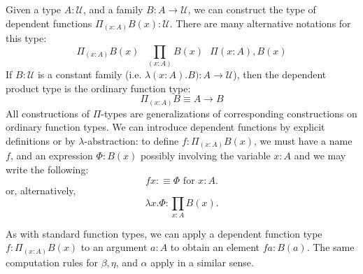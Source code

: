 \documentclass[letterpaper, 10 pt, conference]{ieeeconf}  %
\begin{document}
Given a type $A : \mathcal{U}$, and a family $B: A \rightarrow \mathcal{U}$, we can construct the type of dependent functions $\Pi_{(x:A)}B(x) : \mathcal{U}$. There are many alternative notations for this type: 
\begin{equation}
    \Pi_{(x:A)}B(x)\text{ }\prod_{(x:A)} B(x)\text{ }\Pi (x: A), B(x)
\end{equation}
If $B : \mathcal{U}$ is a constant family (i.e. $\lambda(x : A). B) : A \rightarrow \mathcal{U}$), then the dependent product type is the ordinary function type: 
\begin{equation}
    \Pi_{(x:A)} B \equiv A \rightarrow B
\end{equation}
All constructions of $\Pi$-types are generalizations of corresponding constructions on ordinary function types. We can introduce dependent functions by explicit definitions or by $\lambda$-abstraction: to define $f : \Pi_{(x:A)} B(x)$, we must have a name $f$, and an expression $\Phi : B(x)$ possibly involving the variable $x : A$ and we may write the following:
\begin{equation}
    f x :\equiv \Phi \text{ for } x : A.
\end{equation}
or, alternatively,
\begin{equation}
    \lambda x. \Phi : \prod_{x:A} B(x).
\end{equation}

As with standard function types, we can apply a dependent function type $f : \Pi_{(x:A)} B(x)$ to an argument $a : A$ to obtain an element $f a : B(a)$. The same computation rules for $\beta, \eta$, and $\alpha$ apply in a similar sense. 
\end{document}
